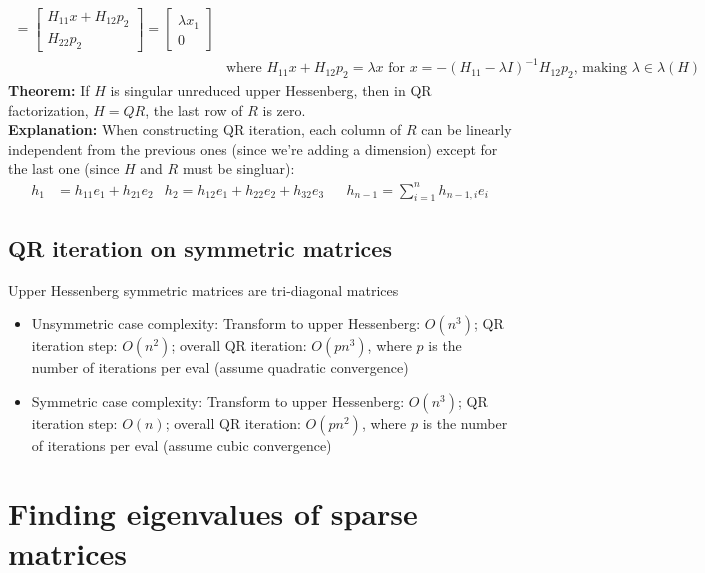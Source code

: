 \documentclass{article}
\begin{document}
\begin{align*}
     = \begin{bmatrix} H_{11}x + H_{12}p_2 \\ H_{22}p_2 \end{bmatrix} = \begin{bmatrix} \lambda x_1 \\ 0 \end{bmatrix}\\
     &\textrm{where } H_{11}x + H_{12}p_2 = \lambda x \textrm{ for } x = -(H_{11} - \lambda I)^{-1}H_{12}p_2 \textrm{, making } \lambda \in \lambda(H)
\end{align*}
\textbf{Theorem:} If $H$ is singular unreduced upper Hessenberg, then in QR factorization, $H=QR$, the last row of $R$ is zero.\\
\textbf{Explanation:} When constructing QR iteration, each column of $R$ can be linearly independent from the previous ones (since we're adding a dimension) except for the last one (since $H$ and $R$ must be singluar):
\begin{align*}
    h_1 &= h_{11}e_1 + h_{21}e_2 & h_2 = h_{12}e_1 + h_{22}e_2 + h_{32}e_3 && h_{n-1} = \sum_{i=1}^n h_{n-1,i}e_i
\end{align*}

\subsection{QR iteration on symmetric matrices}
Upper Hessenberg symmetric matrices are tri-diagonal matrices
\begin{itemize}
    \item Unsymmetric case complexity: Transform to upper Hessenberg: $O(n^3)$; QR iteration step: $O(n^2)$; overall QR iteration: $O(pn^3)$, where $p$ is the number of iterations per eval (assume quadratic convergence)
    \item Symmetric case complexity: Transform to upper Hessenberg: $O(n^3)$; QR iteration step: $O(n)$; overall QR iteration: $O(pn^2)$, where $p$ is the number of iterations per eval (assume cubic convergence) 
\end{itemize}


\section{Finding eigenvalues of sparse matrices}
\end{document}
